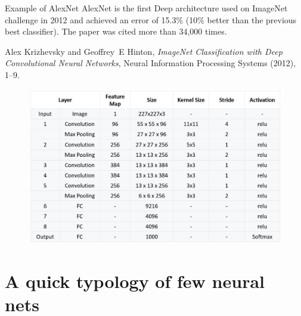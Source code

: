 \documentclass[handout, 10pt]{beamer}
\begin{document}
\begin{frame}{Example of AlexNet}
    \alert{AlexNet} is the first Deep architecture used on ImageNet challenge in 2012 and achieved an \alert{error of 15.3\%} (10\% better than the previous best classifier). The paper was cited more than 34,000 times.

\begin{thebibliography}{GBC16}

Alex Krizhevsky and Geoffrey~E Hinton, \emph{{ImageNet Classification with Deep
  Convolutional Neural Networks}}, Neural Information Processing Systems
  (2012), 1--9.

\end{thebibliography}
    \begin{figure}
        \centering
        \includegraphics[width=.5\textwidth]{fig/L2/AlexNet_Summary_Table.jpg}

    \end{figure}
\end{frame}

\section{A quick typology of few neural nets}
\end{document}
